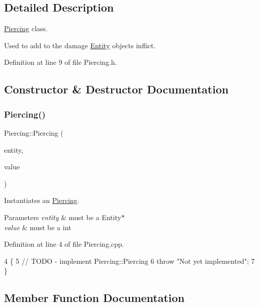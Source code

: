 \subsection{Detailed Description}
\hyperlink{classPiercing}{Piercing} class. 

Used to add to the damage \hyperlink{classEntity}{Entity} objects inflict. 

Definition at line 9 of file Piercing.\+h.



\subsection{Constructor \& Destructor Documentation}
\mbox{\label{classPiercing_a45a6d5d3b6e7ac24ebba63e56246d887}} 
\subsubsection{\texorpdfstring{Piercing()}{Piercing()}}
{\footnotesize\ttfamily Piercing\+::\+Piercing (\begin{DoxyParamCaption}\item[{\hyperlink{classEntity}{Entity} $\ast$}]{entity,  }\item[{int}]{value }\end{DoxyParamCaption})}



Instantiates an \hyperlink{classPiercing}{Piercing}. 


\begin{DoxyParams}{Parameters}
{\em entity} & must be a Entity$\ast$ \\
\hline
{\em value} & must be a int \\
\hline
\end{DoxyParams}


Definition at line 4 of file Piercing.\+cpp.


\begin{DoxyCode}
4                                             \{
5     \textcolor{comment}{// TODO - implement Piercing::Piercing}
6     \textcolor{keywordflow}{throw} \textcolor{stringliteral}{"Not yet implemented"};
7 \}
\end{DoxyCode}


\subsection{Member Function Documentation}
\mbox{\label{classPiercing_a2dbd4a497f9abbebbbd2ceb2909f6163}} 

